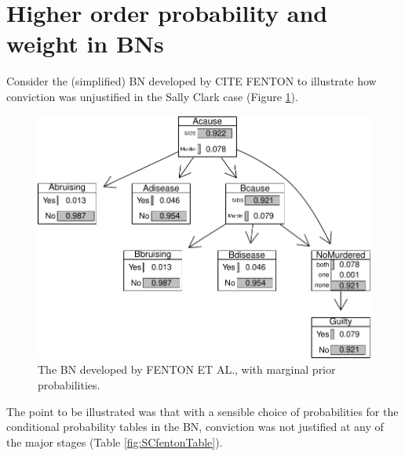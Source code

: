 \documentclass[
  10pt,
  dvipsnames,enabledeprecatedfontcommands]{scrartcl}
\begin{document}

\hypertarget{higher-order-probability-and-weight-in-bns}{%
\section{Higher order probability and weight in
BNs}\label{higher-order-probability-and-weight-in-bns}}

Consider the (simplified) BN developed by CITE FENTON to illustrate how
conviction was unjustified in the Sally Clark case (Figure
\ref{fig:scBNplot}).

\begin{figure}

\begin{center}\includegraphics[width=0.9\linewidth]{imprecision_weight_files/figure-latex/scBNplot-1} \end{center}
\caption{The BN developed by FENTON ET AL., with marginal prior probabilities.}
\label{fig:scBNplot}
\end{figure}

The point to be illustrated was that with a sensible choice of
probabilities for the conditional probability tables in the BN,
conviction was not justified at any of the major stages (Table
\ref{fig:SCfentonTable}).
\end{document}
